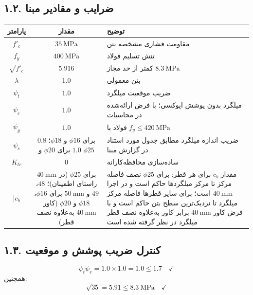 \documentclass[11pt]{article}
\begin{document}
\subsection*{۱.۲. ضرایب و مقادیر مبنا}
\begin{center}
\begin{tabularx}{\linewidth}{|c|c|X|}
\hline
\rowcolor{hdrcol}\textbf{پارامتر} & \textbf{مقدار} & \textbf{توضیح} \\
\hline
$f'_c$ & $35\ \mathrm{MPa}$ & مقاومت فشاری مشخصه بتن \\
\hline
$f_y$ & $400\ \mathrm{MPa}$ & تنش تسلیم فولاد \\
\hline
$\sqrt{f'_c}$ & $5.916$ & کمتر از حد مجاز $8.3\ \mathrm{MPa}$ \\
\hline
$\lambda$ & $1.0$ & بتن معمولی \\
\hline
$\psi_t$ & $1.0$ & ضریب موقعیت میلگرد \\
\hline
$\psi_e$ & $1.0$ & میلگرد بدون پوشش اپوکسی؛ با فرض ارائه‌شده در محاسبات \\
\hline
$\psi_g$ & $1.0$ & فولاد با $f_y \leq 420\ \mathrm{MPa}$ \\
\hline
$\psi_s$ & $0.8$ برای $\phi 16$ و $\phi 18$؛ $1.0$ برای $\phi 20$ و $\phi 25$ & ضریب اندازه میلگرد مطابق جدول مورد استناد در گزارش مبنا \\
\hline
$K_{tr}$ & $0$ & ساده‌سازی محافظه‌کارانه \\
\hline
|$c_b$ & $40\ \mathrm{mm}$ برای $\phi 25$ (در راستای اطمینان)؛ $48$، $49$ و $50\ \mathrm{mm}$ برای $\phi 16$، $\phi 18$ و $\phi 20$ (کاور $40\ \mathrm{mm}$ به‌علاوه نصف قطر) & مقدار $c_b$ برای هر قطر: برای $\phi 25$ نصف فاصله مرکز تا مرکز میلگردها حاکم است و در اجرا $40\ \mathrm{mm}$ است؛ برای سایر قطرها فاصله مرکز میلگرد تا نزدیک‌ترین سطح بتن حاکم است و با فرض کاور $40\ \mathrm{mm}$ برابر کاور به‌علاوه نصف قطر میلگرد در نظر گرفته شده است \\
\hline
\end{tabularx}
\end{center}

\subsection*{۱.۳. کنترل ضریب پوشش و موقعیت}
\begin{equation}
\psi_t \psi_e = 1.0 \times 1.0 = 1.0 \leq 1.7 \quad \checkmark
\end{equation}
همچنین:
\begin{equation}
\sqrt{35} = 5.91 \leq 8.3\ \mathrm{MPa} \quad \checkmark
\end{equation}
\end{document}
